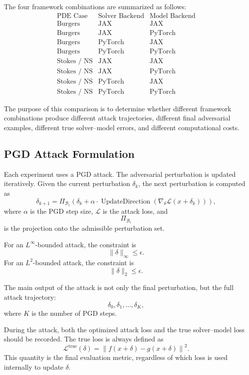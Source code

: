 \documentclass{article}
\begin{document}
The four framework combinations are summarized as follows:
\[
\begin{array}{c|c|c}
\text{PDE Case} & \text{Solver Backend} & \text{Model Backend} \\
\hline
\text{Burgers} & \text{JAX} & \text{JAX} \\
\text{Burgers} & \text{JAX} & \text{PyTorch} \\
\text{Burgers} & \text{PyTorch} & \text{JAX} \\
\text{Burgers} & \text{PyTorch} & \text{PyTorch} \\
\text{Stokes / NS} & \text{JAX} & \text{JAX} \\
\text{Stokes / NS} & \text{JAX} & \text{PyTorch} \\
\text{Stokes / NS} & \text{PyTorch} & \text{JAX} \\
\text{Stokes / NS} & \text{PyTorch} & \text{PyTorch}
\end{array}
\]

The purpose of this comparison is to determine whether different framework combinations produce different attack trajectories, different final adversarial examples, different true solver--model errors, and different computational costs.

\subsection{PGD Attack Formulation}

Each experiment uses a PGD attack. The adversarial perturbation is updated iteratively. Given the current perturbation \(\delta_k\), the next perturbation is computed as
\[
\delta_{k+1}
=
\Pi_{\mathcal{B}_{\epsilon}}
\left(
\delta_k
+
\alpha \cdot
\operatorname{UpdateDirection}
\left(
\nabla_{\delta}\mathcal{L}(x+\delta_k)
\right)
\right),
\]
where \(\alpha\) is the PGD step size, \(\mathcal{L}\) is the attack loss, and
\[
\Pi_{\mathcal{B}_{\epsilon}}
\]
is the projection onto the admissible perturbation set.

For an \(L^{\infty}\)-bounded attack, the constraint is
\[
\|\delta\|_{\infty} \leq \epsilon.
\]
For an \(L^2\)-bounded attack, the constraint is
\[
\|\delta\|_2 \leq \epsilon.
\]

The main output of the attack is not only the final perturbation, but the full attack trajectory:
\[
\delta_0,\delta_1,\dots,\delta_K,
\]
where \(K\) is the number of PGD steps.

During the attack, both the optimized attack loss and the true solver--model loss should be recorded. The true loss is always defined as
\[
\mathcal{L}^{\mathrm{true}}(\delta)
=
\left\|
f(x+\delta)-g(x+\delta)
\right\|^2.
\]
This quantity is the final evaluation metric, regardless of which loss is used internally to update \(\delta\).
\end{document}
